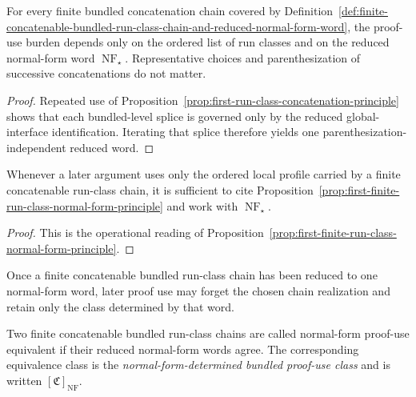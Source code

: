 \begin{proposition}
\label{prop:first-finite-run-class-normal-form-principle}
For every finite bundled concatenation chain covered by Definition~\ref{def:finite-concatenable-bundled-run-class-chain-and-reduced-normal-form-word}, the proof-use burden depends only on the ordered list of run classes and on the reduced normal-form word $\operatorname{NF}_{\star}$. Representative choices and parenthesization of successive concatenations do not matter.
\end{proposition}

\begin{proof}
Repeated use of Proposition~\ref{prop:first-run-class-concatenation-principle} shows that each bundled-level splice is governed only by the reduced global-interface identification. Iterating that splice therefore yields one parenthesization-independent reduced word.
\end{proof}

\begin{corollary}
\label{cor:use-rule-for-the-first-finite-run-class-normal-form-principle}
Whenever a later argument uses only the ordered local profile carried by a finite concatenable run-class chain, it is sufficient to cite Proposition~\ref{prop:first-finite-run-class-normal-form-principle} and work with $\operatorname{NF}_{\star}$.
\end{corollary}

\begin{proof}
This is the operational reading of Proposition~\ref{prop:first-finite-run-class-normal-form-principle}.
\end{proof}

\begin{remark}
\label{rem:status-of-the-first-normal-form-determined-bundled-proof-use-class-step}
Once a finite concatenable bundled run-class chain has been reduced to one normal-form word, later proof use may forget the chosen chain realization and retain only the class determined by that word.
\end{remark}

\begin{definition}
\label{def:normal-form-determined-bundled-proof-use-class}
Two finite concatenable bundled run-class chains are called normal-form proof-use equivalent if their reduced normal-form words agree. The corresponding equivalence class is the \emph{normal-form-determined bundled proof-use class} and is written $[\mathfrak C]_{\operatorname{NF}}$.
\end{definition}


